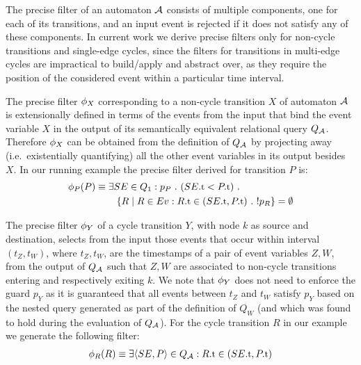 





The precise filter of an automaton $\mathcal{A}$ consists of multiple components, one 
for each of its transitions, and an input event is rejected if it does not 
satisfy any of these components. 
In current work we derive precise filters only for non-cycle transitions and 
single-edge cycles, since the filters for transitions in multi-edge cycles 
are impractical to build/apply and abstract over, as they require the position 
of the considered event within a particular time interval.
 

The precise filter $\phi_{X}$ corresponding to a non-cycle transition $X$ of 
automaton $\mathcal{A}$ is extensionally defined in terms of the events 
from the input that bind the event variable $X$ in the output of its 
semantically equivalent relational query $Q_{\mathcal{A}}$. 
Therefore $\phi_{X}$ can be obtained from the definition of $Q_{\mathcal{A}}$ by 
projecting away (i.e.\ existentially quantifying) all the other event variables 
in its output besides $X$. 
In our running example the precise filter derived for transition $P$ is:
\begin{align*}
&\precs{P}(P) \equiv \exists SE \in Q_1:
p_P\ .\ (\facc{SE}{t} < \facc{P}{t})\ . 
\\ 
&\qqquad\quad
\{ R \mid R \in \Ev : \facc{R}{t} \in (\facc{SE}{t}, \facc{P}{t})\ .\ 
! p_R \} = \emptyset
\end{align*}

The precise filter $\phi_{Y}$ of a cycle transition $Y$, with node $k$ as 
source 
and destination, selects from the input those events that occur within interval 
$(t_Z, t_W)$, where $t_Z, t_W$, are the timestamps of a pair of event variables 
$Z, W$, from the output of $Q_{\mathcal{A}}$ such that $Z, W$ are associated to 
non-cycle transitions entering and respectively exiting $k$.
We note that $\phi_{Y}$ does not need to enforce the guard $p_Y$ as it is 
guaranteed
that all events between $t_Z$ and $t_W$ satisfy $p_Y$ based on the
nested query generated as part of the definition of $Q_W$ (and which was found 
to hold during the evaluation of $Q_{\mathcal{A}}$).
For the cycle transition $R$ in our example we generate the following filter:
\begin{align*}
\precs{R}(R) \equiv \exists \tuple{SE,P} \in Q_{\cA}: 
 \facc{R}{t} \in (\facc{SE}{t}, \facc{P}{t})
\end{align*}
   



